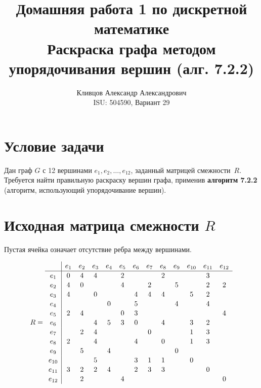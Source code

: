 \documentclass[a4paper,12pt]{article}
\title{\textbf{Домашняя работа 1 по дискретной математике}\\[0.5em]
\large Раскраска графа методом упорядочивания вершин (алг. 7.2.2)}
\author{Кливцов Александр Александрович \\ ISU: 504590, Вариант 29}
\date{}
\begin{document}
\maketitle
\thispagestyle{empty}

\section*{Условие задачи}

Дан граф $G$ с 12 вершинами $e_1, e_2, \ldots, e_{12}$, заданный матрицей смежности~$R$.
Требуется найти правильную раскраску вершин графа, применив \textbf{алгоритм 7.2.2}
(алгоритм, использующий упорядочивание вершин).

\section*{Исходная матрица смежности $R$}

Пустая ячейка означает отсутствие ребра между вершинами.

\[
	R =
	\renewcommand{\arraystretch}{1.1}
	\begin{array}{c|cccccccccccc}
		       & e_1 & e_2 & e_3 & e_4 & e_5 & e_6 & e_7 & e_8 & e_9 & e_{10} & e_{11} & e_{12} \\\hline
		e_1    & 0   & 4   & 4   &     & 2   &     &     & 2   &     &        & 3      &        \\
		e_2    & 4   & 0   &     &     & 4   &     & 2   &     & 5   &        & 2      & 2      \\
		e_3    & 4   &     & 0   &     &     & 4   & 4   & 4   &     & 5      & 2      &        \\
		e_4    &     &     &     & 0   &     & 5   &     &     & 4   &        & 4      &        \\
		e_5    & 2   & 4   &     &     & 0   & 3   &     &     &     &        &        & 4      \\
		e_6    &     &     & 4   & 5   & 3   & 0   &     & 4   &     & 3      & 2      &        \\
		e_7    &     & 2   & 4   &     &     &     & 0   &     &     & 1      & 3      &        \\
		e_8    & 2   &     & 4   &     &     & 4   &     & 0   &     & 1      & 3      &        \\
		e_9    &     & 5   &     & 4   &     &     &     &     & 0   &        &        &        \\
		e_{10} &     &     & 5   &     &     & 3   & 1   & 1   &     & 0      &        &        \\
		e_{11} & 3   & 2   & 2   & 4   &     & 2   & 3   & 3   &     &        & 0      &        \\
		e_{12} &     & 2   &     &     & 4   &     &     &     &     &        &        & 0      \\
	\end{array}
\]
\end{document}
